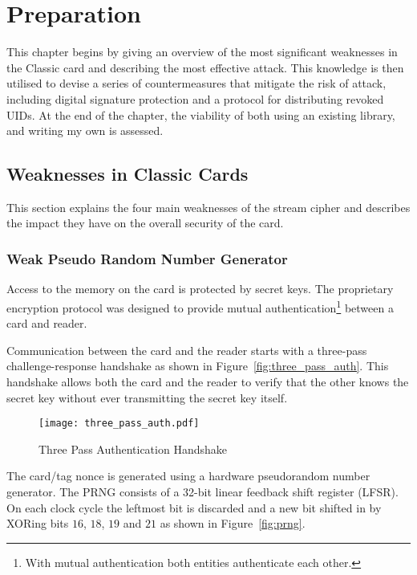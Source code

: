 \documentclass[dissertation.tex]{subfiles}
\begin{document}
  \chapter{Preparation}

  This chapter begins by giving an overview of the most significant weaknesses in the \mifare{} Classic card and describing the most effective attack. This knowledge is then utilised to devise a series of countermeasures that mitigate the risk of attack, including digital signature protection and a protocol for distributing revoked UIDs. At the end of the chapter, the viability of both using an existing \mifare{} library, and writing my own is assessed.

  \section{Weaknesses in \mifare{} Classic Cards}

  This section explains the four main weaknesses of the \crypto{} stream cipher and describes the impact they have on the overall security of the card.

  \subsection{Weak Pseudo Random Number Generator}
  Access to the memory on the card is protected by secret keys. The proprietary encryption protocol \crypto{} was designed to provide mutual authentication\footnote{With mutual authentication both entities authenticate each other.} between a card and reader.

  Communication between the card and the reader starts with a three-pass challenge-response handshake as shown in Figure~\vref{fig:three_pass_auth}. This handshake allows both the card and the reader to verify that the other knows the secret key without ever transmitting the secret key itself.

  \begin{figure}[h]
    \centering
    \texttt{[image: three\_pass\_auth.pdf]}
    \caption{Three Pass Authentication Handshake}\label{fig:three_pass_auth}
  \end{figure}


  The card/tag nonce is generated using a hardware pseudorandom number generator. The PRNG consists of a 32-bit linear feedback shift register (LFSR). On each clock cycle the leftmost bit is discarded and a new bit shifted in by XORing bits $16$, $18$, $19$ and $21$ as shown in Figure~\ref{fig:prng}.
\end{document}
